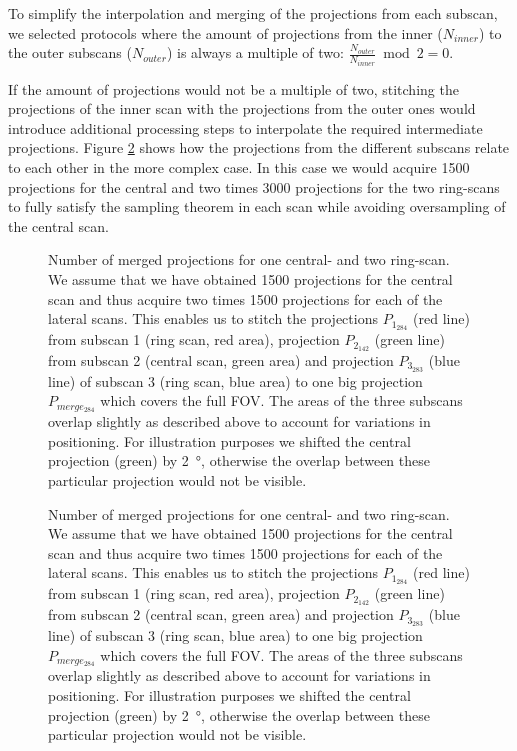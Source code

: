 To simplify the interpolation and merging of the projections from each subscan, we selected protocols where the amount of projections from the inner ($N_{inner}$) to the outer subscans ($N_{outer}$) is always a multiple of two: $\frac{N_{outer}}{N_{inner}} \bmod 2 = 0$.

If the amount of projections would not be a multiple of two, stitching the projections of the inner scan with the projections from the outer ones would introduce additional processing steps to interpolate the required intermediate projections. Figure \ref{fig:amount of projections} shows how the projections from the different subscans relate to each other in the more complex case. In this case we would acquire 1500 projections for the central and two times 3000 projections for the two ring-scans to fully satisfy the sampling theorem in each scan while avoiding oversampling of the central scan. 

\ifiucr
	\begin{figure}%
		\caption{Number of merged projections for one central- and two ring-scan. We assume that we have obtained 1500 projections for the central scan and thus acquire two times 1500 projections for each of the lateral scans. This enables us to stitch the projections $P_{1_{284}}$ %
	 		(red line) from subscan 1 (ring scan, red area), projection $P_{2_{142}}$ %
	 		(green line) from subscan 2 (central scan, green area) and projection $P_{3_{283}}$ %
	 		(blue line) of subscan 3 (ring scan, blue area) to one big projection $P_{merge_{284}}$ %
			which covers the full FOV. The areas of the three subscans overlap slightly as described above to account for variations in positioning. For illustration purposes we shifted the central projection (green) by \SI{2}{\degree}, otherwise the overlap between these particular projection would not be visible.}%
		\label{fig:amount of projections}%
	\end{figure}%
\else
	\begin{figure*}[htp]
		\centering
		\caption{Number of merged projections for one central- and two ring-scan. We assume that we have obtained 1500 projections for the central scan and thus acquire two times 1500 projections for each of the lateral scans. This enables us to stitch the projections $P_{1_{284}}$ %
	 		(red line) from subscan 1 (ring scan, red area), projection $P_{2_{142}}$ %
	 		(green line) from subscan 2 (central scan, green area) and projection $P_{3_{283}}$ %
	 		(blue line) of subscan 3 (ring scan, blue area) to one big projection $P_{merge_{284}}$ %
			which covers the full FOV. The areas of the three subscans overlap slightly as described above to account for variations in positioning. For illustration purposes we shifted the central projection (green) by \SI{2}{\degree}, otherwise the overlap between these particular projection would not be visible.}%
		\label{fig:amount of projections}%
	\end{figure*}
\fi


